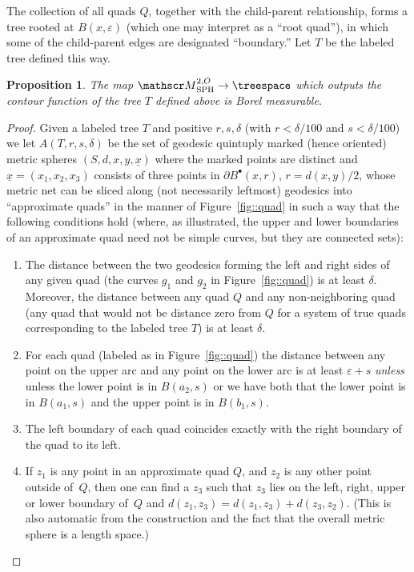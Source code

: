 \documentclass[10pt]{amsart}
\let\mathcal\mathscr
\newcommand{\sbullet}{{\scriptscriptstyle\bullet}}
\let\epsilon\varepsilon
\theoremstyle{plain}
\numberwithin{theorem}{section}
\newtheorem{proposition}[theorem]{Proposition}
\theoremstyle{definition}
\newcommand\gmsspace{{\mathcal M}_{\mathrm{SPH}}}
\let\ul\underline
\newcommand{\fb}[2]{B^\sbullet(#1,#2)}
\begin{document}
The collection of all quads $Q$, together with the child-parent relationship, forms a tree rooted at $B(x, \epsilon)$ (which one may interpret as a ``root quad''), in which some of the child-parent edges are designated ``boundary.'' Let $T$ be the labeled tree defined this way.

\begin{proposition}
\label{prop::treemeasurable}
The map $\gmsspace^{2,O} \to \treespace$ which outputs the contour function of the tree $T$ defined above is Borel measurable.
\end{proposition}
\begin{proof}
Given a labeled tree $T$ and positive $r,s,\delta$ (with $r<\delta/100$ and $s<\delta/100$) we let $A(T,r,s,\delta)$ be the set of geodesic quintuply marked (hence oriented) metric spheres $(S,d,x,y,\ul{x})$ where the marked points are distinct and $\ul{x} = (x_1,x_2,x_3)$ consists of three points in $\partial \fb{x}{r}$, $r = d(x,y)/2$, whose metric net can be sliced along (not necessarily leftmost) geodesics into ``approximate quads'' in the manner of Figure~\ref{fig::quad} in such a way that the following conditions hold (where, as illustrated, the upper and lower boundaries of an approximate quad need not be simple curves, but they are connected sets):
\begin{enumerate}
\item The distance between the two geodesics forming the left and right sides of any given quad (the curves $g_1$ and $g_2$ in Figure~\ref{fig::quad}) is at least $\delta$. Moreover, the distance between any quad $Q$ and any non-neighboring quad (\ie any quad that would not be distance zero from $Q$ for a system of true quads corresponding to the labeled tree $T$) is at least $\delta$.
\item For each quad (labeled as in Figure~\ref{fig::quad}) the distance between any point on the upper arc and any point on the lower arc is at least $\epsilon +s$ \emph{unless} unless the lower point is in $B(a_2, s)$ or we have both that the lower point is in $B(a_1,s)$ and the upper point is in $B(b_1,s)$.
\item The left boundary of each quad coincides exactly with the right boundary of the quad to its left.
\item If $z_1$ is any point in an approximate quad $Q$, and $z_2$ is any other point outside of~$Q$, then one can find a $z_3$ such that $z_3$ lies on the left, right, upper or lower boundary of~$Q$ and $d(z_1, z_3) = d(z_1,z_3)+d(z_3,z_2)$. (This is also automatic from the construction and the fact that the overall metric sphere is a length space.)
\end{enumerate}


\end{proof}
\end{document}
